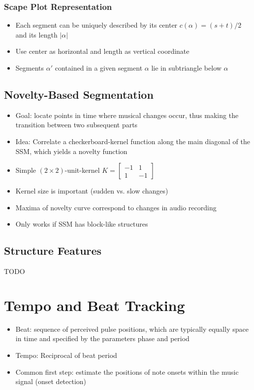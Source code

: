 \documentclass{scrartcl}
\begin{document}
\subsubsection*{Scape Plot Representation}
\begin{itemize}
    \item
        Each segment can be uniquely described by its center $c(\alpha) = (s+t)/2$ and its length $|\alpha|$
    \item
        Use center as horizontal and length as vertical coordinate
    \item
        Segments $\alpha'$ contained in a given segment $\alpha$ lie in subtriangle below $\alpha$
\end{itemize}

\subsection{Novelty-Based Segmentation}
\begin{itemize}
    \item
        Goal: locate points in time where musical changes occur, thus making the transition between two subsequent parts
    \item
        Idea: Correlate a checkerboard-kernel function along the main diagonal of the SSM, which yields a novelty function
    \item
        Simple $(2 \times 2)$-unit-kernel $K = \begin{bmatrix} -1 & 1 \\ 1 & -1 \end{bmatrix}$
    \item
        Kernel size is important (sudden vs. slow changes)
    \item
        Maxima of novelty curve correspond to changes in audio recording
    \item
        Only works if SSM has block-like structures
\end{itemize}

\subsection{Structure Features}
TODO

\newpage

\section{Tempo and Beat Tracking}
\begin{itemize}
    \item
	Beat: sequence of perceived pulse positions, which are typically equally space in time and specified by the parameters phase and period
    \item
	Tempo: Reciprocal of beat period
    \item
	Common first step: estimate the positions of note onsets within the music signal (onset detection)
\end{itemize}
\end{document}
